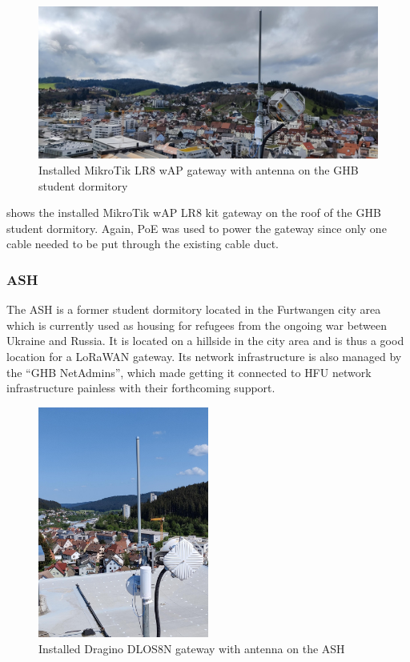 \begin{figure}
    \centering
    \includegraphics[width=1\textwidth]{pictures/hardware/gateway-deployment/lr8_ghb_installation.jpg}
    \caption{Installed MikroTik LR8 wAP gateway with antenna on the \ac{GHB} student dormitory\label{pic:mikrotik-gateway-ghb-installation}}
\end{figure}

 shows the installed MikroTik wAP LR8 kit gateway on the roof of the \ac{GHB} student dormitory.
Again, \ac{PoE} was used to power the gateway since only one cable needed to be put through the existing cable duct.

\subsubsection{\acf{ASH}}

The \ac{ASH} is a former student dormitory located in the Furtwangen city area which is currently used as housing for refugees from the ongoing war between Ukraine and Russia.
It is located on a hillside in the city area and is thus a good location for a \ac{LoRaWAN} gateway.
Its network infrastructure is also managed by the ``\ac{GHB} NetAdmins'', which made getting it connected to \ac{HFU} network infrastructure painless with their forthcoming support.

\begin{figure}
    \centering
    \includegraphics[width=0.5\textwidth]{pictures/hardware/gateway-deployment/gateway_ash.jpg}
    \caption{Installed Dragino DLOS8N gateway with antenna on the \acf{ASH}\label{pic:dragino-gateway-ash}}
\end{figure}

